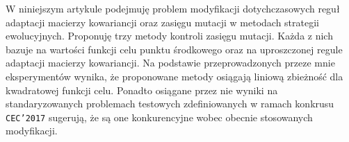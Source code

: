 

W niniejszym artykule podejmuję problem modyfikacji dotychczasowych reguł adaptacji macierzy kowariancji oraz zasięgu mutacji w metodach strategii ewolucyjnych.
Proponuję trzy metody kontroli zasięgu mutacji. Każda z nich bazuje na wartości funkcji celu punktu środkowego oraz na uproszczonej regule adaptacji macierzy kowariancji.
Na podstawie przeprowadzonych przeze mnie eksperymentów wynika, że proponowane metody osiągają liniową zbieżność dla kwadratowej funkcji celu. Ponadto osiągane przez nie wyniki na standaryzowanych problemach testowych zdefiniowanych w ramach konkrusu \texttt{CEC'2017} sugerują, że są one konkurencyjne wobec obecnie stosowanych modyfikacji. 
